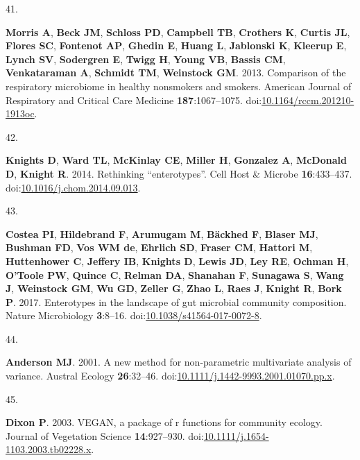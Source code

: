 \documentclass[
]{article}
\newlength{\cslhangindent}
\newlength{\csllabelwidth}
\newlength{\cslentryspacingunit} %
\newenvironment{CSLReferences}[2] %
 {%
  \setlength{\parindent}{0pt}
  \ifodd #1
  \let\oldpar\par
  \def\par{\hangindent=\cslhangindent\oldpar}
  \fi
  \setlength{\parskip}{#2\cslentryspacingunit}
 }%
 {}
\newcommand{\CSLLeftMargin}[1]{\parbox[t]{\csllabelwidth}{#1}}
\newcommand{\CSLRightInline}[1]{\parbox[t]{\linewidth - \csllabelwidth}{#1}\break}
\begin{document}
\begin{CSLReferences}{0}{1}
\leavevmode{}%
\CSLLeftMargin{41. }%
\CSLRightInline{\textbf{Morris A}, \textbf{Beck JM}, \textbf{Schloss
PD}, \textbf{Campbell TB}, \textbf{Crothers K}, \textbf{Curtis JL},
\textbf{Flores SC}, \textbf{Fontenot AP}, \textbf{Ghedin E},
\textbf{Huang L}, \textbf{Jablonski K}, \textbf{Kleerup E},
\textbf{Lynch SV}, \textbf{Sodergren E}, \textbf{Twigg H}, \textbf{Young
VB}, \textbf{Bassis CM}, \textbf{Venkataraman A}, \textbf{Schmidt TM},
\textbf{Weinstock GM}. 2013. Comparison of the respiratory microbiome in
healthy nonsmokers and smokers. American Journal of Respiratory and
Critical Care Medicine \textbf{187}:1067--1075.
doi:\href{https://doi.org/10.1164/rccm.201210-1913oc}{10.1164/rccm.201210-1913oc}.}

\leavevmode{}%
\CSLLeftMargin{42. }%
\CSLRightInline{\textbf{Knights D}, \textbf{Ward TL}, \textbf{McKinlay
CE}, \textbf{Miller H}, \textbf{Gonzalez A}, \textbf{McDonald D},
\textbf{Knight R}. 2014. Rethinking {``}enterotypes{''}. Cell Host {\&}
Microbe \textbf{16}:433--437.
doi:\href{https://doi.org/10.1016/j.chom.2014.09.013}{10.1016/j.chom.2014.09.013}.}

\leavevmode{}%
\CSLLeftMargin{43. }%
\CSLRightInline{\textbf{Costea PI}, \textbf{Hildebrand F},
\textbf{Arumugam M}, \textbf{Bäckhed F}, \textbf{Blaser MJ},
\textbf{Bushman FD}, \textbf{Vos WM de}, \textbf{Ehrlich SD},
\textbf{Fraser CM}, \textbf{Hattori M}, \textbf{Huttenhower C},
\textbf{Jeffery IB}, \textbf{Knights D}, \textbf{Lewis JD}, \textbf{Ley
RE}, \textbf{Ochman H}, \textbf{O'Toole PW}, \textbf{Quince C},
\textbf{Relman DA}, \textbf{Shanahan F}, \textbf{Sunagawa S},
\textbf{Wang J}, \textbf{Weinstock GM}, \textbf{Wu GD}, \textbf{Zeller
G}, \textbf{Zhao L}, \textbf{Raes J}, \textbf{Knight R}, \textbf{Bork
P}. 2017. Enterotypes in the landscape of gut microbial community
composition. Nature Microbiology \textbf{3}:8--16.
doi:\href{https://doi.org/10.1038/s41564-017-0072-8}{10.1038/s41564-017-0072-8}.}

\leavevmode{}%
\CSLLeftMargin{44. }%
\CSLRightInline{\textbf{Anderson MJ}. 2001. A new method for
non-parametric multivariate analysis of variance. Austral Ecology
\textbf{26}:32--46.
doi:\href{https://doi.org/10.1111/j.1442-9993.2001.01070.pp.x}{10.1111/j.1442-9993.2001.01070.pp.x}.}

\leavevmode{}%
\CSLLeftMargin{45. }%
\CSLRightInline{\textbf{Dixon P}. 2003. {VEGAN}, a package of r
functions for community ecology. Journal of Vegetation Science
\textbf{14}:927--930.
doi:\href{https://doi.org/10.1111/j.1654-1103.2003.tb02228.x}{10.1111/j.1654-1103.2003.tb02228.x}.}


\end{CSLReferences}
\end{document}
